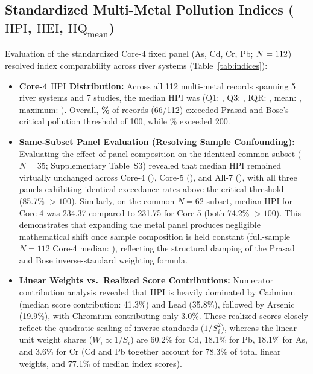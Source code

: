 \documentclass[authoryear,preprint,12pt]{elsarticle}
\begin{document}
\subsection{Standardized Multi-Metal Pollution Indices (\texorpdfstring{$\mathrm{HPI}$, $\mathrm{HEI}$, $\mathrm{HQ}_{\mathrm{mean}}$}{HPI, HEI, HQmean})}
Evaluation of the standardized Core-4 fixed panel (As, Cd, Cr, Pb; $N=112$) resolved index comparability across river systems (Table~\ref{tab:indices}):
\begin{itemize}
    \item \textbf{Core-4 $\mathrm{HPI}$ Distribution:} Across all 112 multi-metal records spanning 5 river systems and 7 studies, the median $\mathrm{HPI}$ was \textbf{\HpiCoreFourMedian} (Q1: \HpiCoreFourQOne, Q3: \HpiCoreFourQThree, IQR: \HpiCoreFourIqr, mean: \HpiCoreFourMean, maximum: \HpiCoreFourMax). Overall, \textbf{\HpiCoreFourShareAboveHundred\%} of records (66/112) exceeded Prasad and Bose's critical pollution threshold of 100, while \HpiCoreFourShareAboveTwoHundred\% exceeded 200.
    \item \textbf{Same-Subset Panel Evaluation (Resolving Sample Confounding):} Evaluating the effect of panel composition on the identical common subset ($N=35$; Supplementary Table~S3) revealed that median $\mathrm{HPI}$ remained virtually unchanged across Core-4 (\HpiCommonSubsetCoreFourMedian), Core-5 (\HpiCommonSubsetCoreFiveMedian), and All-7 (\HpiCommonSubsetAllSevenMedian), with all three panels exhibiting identical exceedance rates above the critical threshold (85.7\% $> 100$). Similarly, on the common $N=62$ subset, median $\mathrm{HPI}$ for Core-4 was 234.37 compared to 231.75 for Core-5 (both 74.2\% $> 100$). This demonstrates that expanding the metal panel produces negligible mathematical shift once sample composition is held constant (full-sample $N=112$ Core-4 median: \HpiCoreFourMedian), reflecting the structural damping of the Prasad and Bose inverse-standard weighting formula.
    \item \textbf{Linear Weights vs.\ Realized Score Contributions:} Numerator contribution analysis revealed that $\mathrm{HPI}$ is heavily dominated by Cadmium (median score contribution: 41.3\%) and Lead (35.8\%), followed by Arsenic (19.9\%), with Chromium contributing only 3.0\%. These realized scores closely reflect the quadratic scaling of inverse standards ($1/S_i^2$), whereas the linear unit weight shares ($W_i \propto 1/S_i$) are 60.2\% for Cd, 18.1\% for Pb, 18.1\% for As, and 3.6\% for Cr (Cd and Pb together account for 78.3\% of total linear weights, and 77.1\% of median index scores).

\end{itemize}
\end{document}
